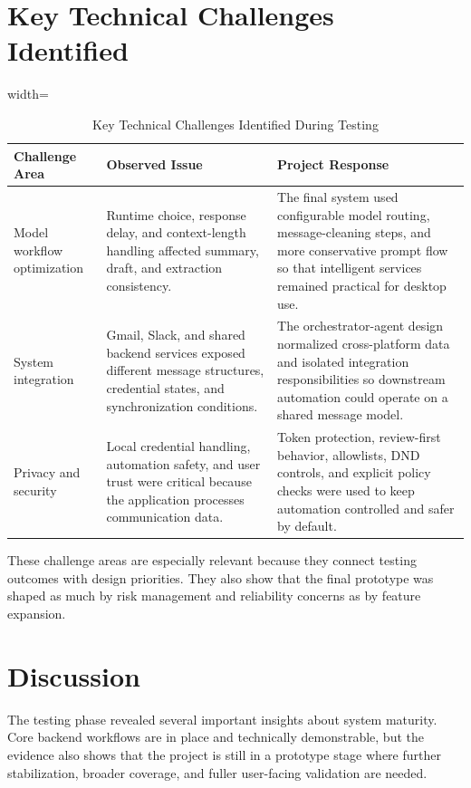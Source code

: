 \section{Key Technical Challenges Identified}
\begin{table}[!htbp]
\centering
\small
\renewcommand{\arraystretch}{1.15}
\setlength{\tabcolsep}{5pt}
\begin{adjustbox}{width=\textwidth}
\begin{tabular}{|>{\raggedright\arraybackslash}p{3.3cm}|>{\raggedright\arraybackslash}p{5.2cm}|>{\raggedright\arraybackslash}p{6cm}|}
\hline
\textbf{Challenge Area} & \textbf{Observed Issue} & \textbf{Project Response} \\ \hline
Model workflow optimization & Runtime choice, response delay, and context-length handling affected summary, draft, and extraction consistency. & The final system used configurable model routing, message-cleaning steps, and more conservative prompt flow so that intelligent services remained practical for desktop use. \\ \hline
System integration & Gmail, Slack, and shared backend services exposed different message structures, credential states, and synchronization conditions. & The orchestrator-agent design normalized cross-platform data and isolated integration responsibilities so downstream automation could operate on a shared message model. \\ \hline
Privacy and security & Local credential handling, automation safety, and user trust were critical because the application processes communication data. & Token protection, review-first behavior, allowlists, DND controls, and explicit policy checks were used to keep automation controlled and safer by default. \\ \hline
\end{tabular}
\end{adjustbox}
\caption{Key Technical Challenges Identified During Testing}
\end{table}

These challenge areas are especially relevant because they connect testing outcomes with design priorities. They also show that the final prototype was shaped as much by risk management and reliability concerns as by feature expansion.

\section{Discussion}
The testing phase revealed several important insights about system maturity. Core backend workflows are in place and technically demonstrable, but the evidence also shows that the project is still in a prototype stage where further stabilization, broader coverage, and fuller user-facing validation are needed.

